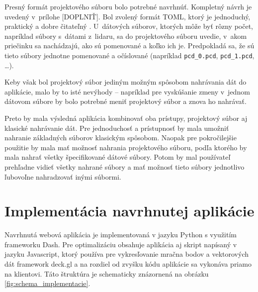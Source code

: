 Presný formát projektového súboru bolo potrebné navrhnúť. Kompletný návrh je uvedený v~prílohe [DOPLNIŤ]. Bol zvolený formát TOML, ktorý je jednoduchý, praktický a dobre čitateľný \cite{toml}. U~dátových súborov, ktorých môže byť rôzny počet, napríklad súbory s~dátami z~lidaru, sa do projektového súboru uvedie, v~akom priečinku sa nachádzajú, ako sú pomenované a koľko ich je. Predpokladá sa, že sú tieto súbory jednotne pomenované a očíslované (napríklad \texttt{pcd\_0.pcd}, \texttt{pcd\_1.pcd}, \dots).

Keby však bol projektový súbor jediným možným spôsobom nahrávania dát do aplikácie, malo by to isté nevýhody -- napríklad pre vyskúšanie zmeny v~jednom dátovom súbore by bolo potrebné meniť projektový súbor a znova ho nahrávať.

Preto by mala výsledná aplikácia kombinovať oba prístupy, projektový súbor aj klasické nahrávanie dát. Pre jednoduchosť a prístupnosť by mala umožniť nahranie základných súborov klasickým spôsobom. Naopak pre pokročilejšie použitie by mala mať možnosť nahrania projektového súboru, podľa ktorého by mala nahrať všetky špecifikované dátové súbory. Potom by mal používateľ prehľadne vidieť všetky nahrané súbory a mať možnosť tieto súbory jednotlivo ľubovoľne nahradzovať inými súbormi.

\chapter{Implementácia navrhnutej aplikácie}

Navrhnutá webová aplikácia je implementovaná v jazyku Python s využitím frameworku Dash. Pre optimalizáciu obsahuje aplikácia aj skript napísaný v jazyku Javascript, ktorý používa pre vykresľovanie mračna bodov a vektorových dát framework deck.gl a na rozdiel od zvyšku kódu aplikácie sa vykonáva priamo na klientovi. Táto štruktúra je schematicky znázornená na obrázku \ref{fig:schema_implementacie}.

